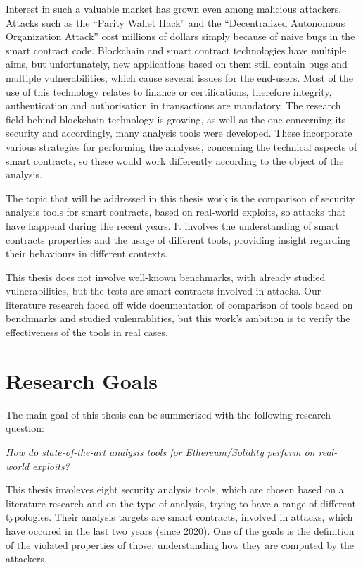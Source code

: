 Interest in such a valuable market has grown even among malicious attackers. 
Attacks such as the “Parity Wallet Hack” and the “Decentralized Autonomous Organization Attack” cost millions of dollars simply because of 
naive bugs in the smart contract code. Blockchain and smart contract technologies have multiple aims, but unfortunately, new applications 
based on them still contain bugs and multiple vulnerabilities, which cause 
several issues for the end-users. Most of the use of this technology relates to finance or certifications, therefore integrity, 
authentication and authorisation in transactions are mandatory. The research field behind blockchain technology is growing, as well as the one concerning 
its security and accordingly, many analysis tools were developed. 
These incorporate various strategies for performing the analyses, concerning the technical aspects of smart contracts, 
so these would work differently according to the object of the analysis. 

The topic that will be addressed in this thesis work is the comparison of security analysis tools for smart contracts, based on real-world exploits, so attacks that have happend during the recent years. 
It involves the understanding of smart contracts properties and the usage of different tools, 
providing insight regarding their behaviours in different contexts.

This thesis does not involve well-known benchmarks, with already studied vulnerabilities, 
but the tests are smart contracts involved in attacks. 
Our literature research faced off wide documentation of comparison of tools based on benchmarks and studied vulenrablities, 
but this work's ambition is to verify the effectiveness of the tools in real cases.

\section{Research Goals}
\label{sec:Introduction:ResearchGoals}
The main goal of this thesis can be summerized with the following research question:

\emph{How do state-of-the-art analysis tools for Ethereum/Solidity perform on real-world exploits?}

This thesis involeves eight security analysis tools, which are chosen based on a literature research and on the type of analysis, trying to have a range of different typologies.
Their analysis targets are smart contracts, involved in attacks, which have occured in the last two years (since 2020). 
One of the goals is the definition of the violated properties of those, understanding how they are computed by the attackers.

